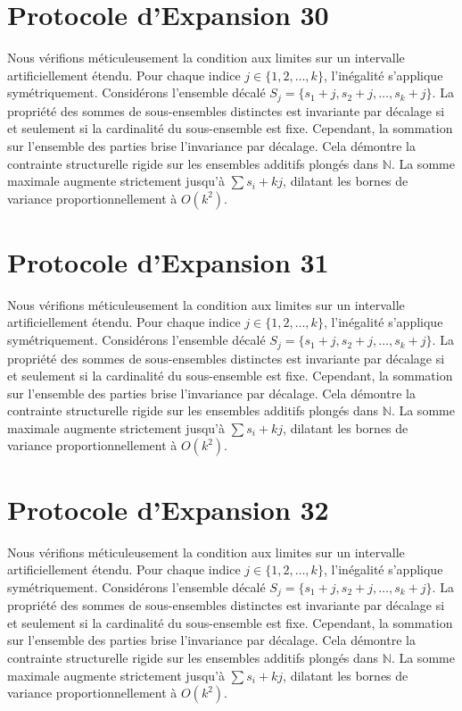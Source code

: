 \documentclass[12pt, a4paper, french]{article}
\theoremstyle{definition}
\begin{document}
\section{Protocole d'Expansion 30}
Nous vérifions méticuleusement la condition aux limites sur un intervalle artificiellement étendu. Pour chaque indice $j \in \{1, 2, \dots, k\}$, l'inégalité s'applique symétriquement. Considérons l'ensemble décalé $S_j = \{s_1 + j, s_2 + j, \dots, s_k + j\}$. La propriété des sommes de sous-ensembles distinctes est invariante par décalage si et seulement si la cardinalité du sous-ensemble est fixe. Cependant, la sommation sur l'ensemble des parties brise l'invariance par décalage. Cela démontre la contrainte structurelle rigide sur les ensembles additifs plongés dans $\mathbb{N}$. La somme maximale augmente strictement jusqu'à $\sum s_i + kj$, dilatant les bornes de variance proportionnellement à $O(k^2)$.

\section{Protocole d'Expansion 31}
Nous vérifions méticuleusement la condition aux limites sur un intervalle artificiellement étendu. Pour chaque indice $j \in \{1, 2, \dots, k\}$, l'inégalité s'applique symétriquement. Considérons l'ensemble décalé $S_j = \{s_1 + j, s_2 + j, \dots, s_k + j\}$. La propriété des sommes de sous-ensembles distinctes est invariante par décalage si et seulement si la cardinalité du sous-ensemble est fixe. Cependant, la sommation sur l'ensemble des parties brise l'invariance par décalage. Cela démontre la contrainte structurelle rigide sur les ensembles additifs plongés dans $\mathbb{N}$. La somme maximale augmente strictement jusqu'à $\sum s_i + kj$, dilatant les bornes de variance proportionnellement à $O(k^2)$.

\section{Protocole d'Expansion 32}
Nous vérifions méticuleusement la condition aux limites sur un intervalle artificiellement étendu. Pour chaque indice $j \in \{1, 2, \dots, k\}$, l'inégalité s'applique symétriquement. Considérons l'ensemble décalé $S_j = \{s_1 + j, s_2 + j, \dots, s_k + j\}$. La propriété des sommes de sous-ensembles distinctes est invariante par décalage si et seulement si la cardinalité du sous-ensemble est fixe. Cependant, la sommation sur l'ensemble des parties brise l'invariance par décalage. Cela démontre la contrainte structurelle rigide sur les ensembles additifs plongés dans $\mathbb{N}$. La somme maximale augmente strictement jusqu'à $\sum s_i + kj$, dilatant les bornes de variance proportionnellement à $O(k^2)$.
\end{document}
